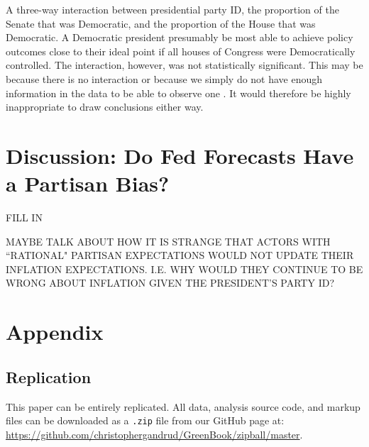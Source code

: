 \documentclass[a4paper]{article}\usepackage{graphicx, color}
\begin{document}
A three-way interaction between presidential party ID, the proportion of the Senate that was Democratic, and the proportion of the House that was Democratic. A Democratic president presumably be most able to achieve policy outcomes close to their ideal point if all houses of Congress were Democratically controlled. The interaction, however, was not statistically significant. This may be because there is no interaction or because we simply do not have enough information in the data to be able to observe one \citep[see][]{Brambor2006}. It would therefore be highly inappropriate to draw conclusions either way.


\section*{Discussion: Do Fed Forecasts Have a Partisan Bias?}

FILL IN

MAYBE TALK ABOUT HOW IT IS STRANGE THAT ACTORS WITH ``RATIONAL" PARTISAN EXPECTATIONS WOULD NOT UPDATE THEIR INFLATION EXPECTATIONS. I.E. WHY WOULD THEY CONTINUE TO BE WRONG ABOUT INFLATION GIVEN THE PRESIDENT'S PARTY ID?

\clearpage
\section*{Appendix}

\subsection*{Replication}

This paper can be entirely replicated. All data, analysis source code, and markup files can be downloaded as a {\tt{.zip}} file from our GitHub page at: {\url{https://github.com/christophergandrud/GreenBook/zipball/master}}.

\end{document}
